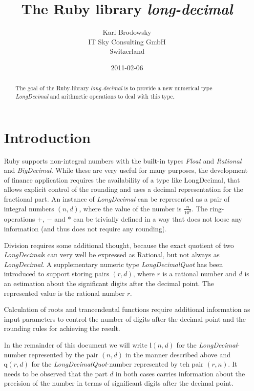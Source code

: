 \documentclass[10pt,a4paper]{article}
\title{The Ruby library {\slshape long-decimal}}
\author{Karl Brodowsky\\
IT Sky Consulting GmbH\\
Switzerland}
\date{2011-02-06}
\def\ld{\mathrm l}
\def\ldq{\mathrm q}
\begin{document}
\sffamily
\maketitle

\begin{abstract}

The goal of the Ruby-library {\slshape long-decimal}\/ is to provide a new
numerical type {\slshape LongDecimal}\/ and arithmetic operations to deal
with this type.

\end{abstract}

\section{Introduction}

Ruby supports non-integral numbers with the built-in types {\slshape
  Float\/} and {\slshape Rational\/} and {\slshape BigDecimal\/}.
While these are very useful for many purposes, the development of
finance application requires the availability of a type like
LongDecimal, that allows explicit control of the rounding and uses a
decimal representation for the fractional part.  An instance of
{\slshape LongDecimal\/} can be represented as a pair of integral
numbers $(n, d)$, where the value of the number is $\frac{n}{10^d}$.
The ring-operations $+$, $-$ and $*$ can be trivially defined in a way
that does not loose any information (and thus does not require any
rounding).

Division requires some additional thought, because the exact quotient
of two {\slshape LongDecimal\/}s can very well be expressed as
Rational, but not always as {\slshape LongDecimal\/}.  A supplementary
numeric type {\slshape LongDecimalQuot\/} has been introduced to
support storing pairs $(r, d)$, where $r$ is a rational number and $d$
is an estimation about the significant digits after the decimal point.
The represented value is the rational number $r$.

Calculation of roots and trancendental functions require additional
information as input parameters to control the number of digits after
the decimal point and the rounding rules for achieving the result.

In the remainder of this document we will write $\ld(n, d)$ for the
{\slshape LongDecimal\/}-number represented by the pair $(n, d)$ in
the manner described above and $\ldq(r, d)$ for the {\slshape
  LongDecimalQuot\/}-number represented by teh pair $(r, n)$.  It
needs to be observed that the part $d$ in both cases carries
information about the precision of the number in terms of significant
digits after the decimal point.
\end{document}
